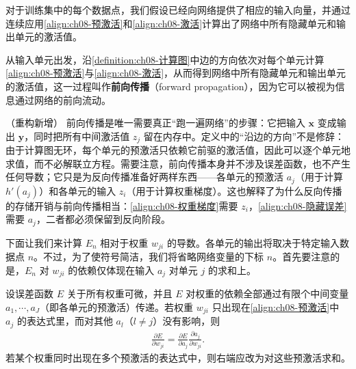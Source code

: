\documentclass[../../main.tex]{subfiles}
\begin{document}
对于训练集中的每个数据点，我们假设已经向网络提供了相应的输入向量，并通过连续应用\eqref{align:ch08-预激活}和\eqref{align:ch08-激活}计算出了网络中所有隐藏单元和输出单元的激活值。

\begin{definition}[前向传播]\label{definition:ch08-前向传播}
从输入单元出发，沿\cref{definition:ch08-计算图}中边的方向依次对每个单元计算\eqref{align:ch08-预激活}与\eqref{align:ch08-激活}，从而得到网络中所有隐藏单元和输出单元的激活值，这一过程叫作\textbf{前向传播}（forward propagation），因为它可以被视为信息通过网络的前向流动。
\end{definition}

\begin{remark}（重构新增）
前向传播是唯一需要真正“跑一遍网络”的步骤：它把输入 $\mathbf{x}$ 变成输出 $\mathbf{y}$，同时把所有中间激活值 $z_j$ 留在内存中。定义中的“沿边的方向”不是修辞：由于计算图无环，每个单元的预激活只依赖它前驱的激活值，因此可以逐个单元地求值，而不必解联立方程。需要注意，前向传播本身并不涉及误差函数，也不产生任何导数；它只是为反向传播准备好两样东西——各单元的预激活 $a_j$（用于计算 $h'(a_j)$）和各单元的输入 $z_i$（用于计算权重梯度）。这也解释了为什么反向传播的存储开销与前向传播相当：\eqref{align:ch08-权重梯度}需要 $z_i$，\eqref{align:ch08-隐藏误差}需要 $a_j$，二者都必须保留到反向阶段。
\end{remark}

下面让我们来计算 $E_n$ 相对于权重 $w_{ji}$ 的导数。各单元的输出将取决于特定输入数据点 $n$。不过，为了使符号简洁，我们将省略网络变量的下标 $n$。首先要注意的是，$E_n$ 对 $w_{ji}$ 的依赖仅体现在输入 $a_j$ 对单元 $j$ 的求和上。

\begin{proposition}[偏导数的链式法则]\label{proposition:ch08-链式法则}
设误差函数 $E$ 关于所有权重可微，并且 $E$ 对权重的依赖全部通过有限个中间变量 $a_1,\cdots,a_J$（即各单元的预激活）传递。若权重 $w_{ji}$ 只出现在\eqref{align:ch08-预激活}中 $a_j$ 的表达式里，而对其他 $a_l$（$l\neq j$）没有影响，则
\begin{align}
\frac{\partial E}{\partial w_{ji}}=\frac{\partial E}{\partial a_j}\frac{\partial a_j}{\partial w_{ji}}.
\label{align:ch08-链式法则}
\end{align}
若某个权重同时出现在多个预激活的表达式中，则右端应改为对这些预激活求和。
\end{proposition}
\end{document}
